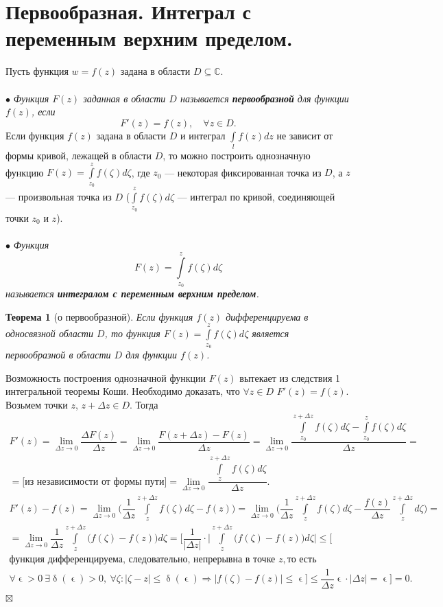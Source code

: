 \documentclass[a4paper, 12pt]{article}
\newenvironment{Proof} %
{\par\noindent{$\blacklozenge$}} %
{\hfill$\scriptstyle\boxtimes$}
\newcommand{\Cm}{\mathbb{C}}
\renewcommand{\leq}{\leqslant}
\renewcommand{\delta}{\updelta}
\newcommand{\intl}{\int\limits_l}
\renewcommand{\epsilon}{\upvarepsilon}
\newcommand{\limdef}{\forall \epsilon >0\ \exists \delta (\epsilon) > 0}
\newtheorem*{theorem}{Теорема}
\begin{document}
\section{Первообразная. Интеграл с переменным верхним пределом.}
Пусть функция $w = f(z)$ задана в области $D \subseteq \Cm$.\\\\
$\bullet$ \textit{Функция $F(z)$ заданная в области $D$ называется \textbf{первообразной} для функции $f(z)$, если $$F'(z) = f(z),\quad \forall z \in D.$$}
Если функция $f(z)$ задана в области $D$ и интеграл $\intl f(z)dz$ не зависит от формы кривой, лежащей в области $D$, то можно построить однозначную функцию $F(z) = \int\limits_{z_0}^z f(\zeta)d\zeta$, где $z_0$ --- некоторая фиксированная точка из $D$, а $z$ --- произвольная точка из $D$ ($\int\limits_{z_0}^z f(\zeta)d\zeta$ --- интеграл по кривой, соединяющей точки $z_0$ и $z$).\\\\
$\bullet$ \textit{Функция $$F(z) = \int\limits_{z_0}^z f(\zeta)d\zeta$$ называется \textbf{интегралом с переменным верхним пределом}.}\begin{theorem}
	[о первообразной] Если функция $f(z)$ дифференцируема в односвязной области $D$, то функция $F(z) = \int\limits_{z_0}^z f(\zeta)d\zeta$ является первообразной в области $D$ для функции $f(z)$.
\end{theorem}\begin{Proof}
Возможность построения однозначной функции $F(z)$ вытекает из  следствия 1 интегральной теоремы Коши. Необходимо доказать, что $\forall z \in D$ $F'(z) = f(z)$. Возьмем точки $z$, $z + \Delta z \in D$. Тогда \begin{multline*}
	F'(z) = \lim\limits_{\Delta z \to 0} \dfrac{\Delta F(z)}{\Delta z} = \lim\limits_{\Delta z \to 0} \dfrac{F(z + \Delta z) - F(z)}{\Delta z} = \lim\limits_{\Delta z \to 0} \dfrac{\int\limits_{z_0}^{z + \Delta z}f(\zeta)d\zeta - \int\limits_{z_0}^{z}f(\zeta)d\zeta}{\Delta z}=\\=\text{[из независимости от формы пути]} = \lim\limits_{\Delta z \to 0} \dfrac{\int\limits_{z}^{z + \Delta z}f(\zeta)d\zeta}{\Delta z}.
\end{multline*}
\begin{multline*}
	F'(z) - f(z) = \lim\limits_{\Delta z \to 0}\Big(\dfrac{1}{\Delta z}\int\limits_{z}^{z + \Delta z}f(\zeta)d\zeta - f(z) \Big) = \lim\limits_{\Delta z \to 0}\Big(\dfrac{1}{\Delta z}\int\limits_{z}^{z + \Delta z}f(\zeta)d\zeta - \dfrac{f(z)}{\Delta z} \int\limits_{z}^{z + \Delta z}d\zeta \Big) = \\ =\lim\limits_{\Delta z \to 0} \dfrac{1}{\Delta z} \int\limits_{z}^{z + \Delta z} \Big( f(\zeta) - f(z)\Big)d\zeta = \Big[ \dfrac{1}{|\Delta z|}\cdot \Big|\int\limits_{z}^{z + \Delta z} \Big( f(\zeta) - f(z)\Big)d\zeta\Big|\leq \big[\\ \text{функция дифференцируема, следовательно, непрерывна в точке } z, \text{то есть} \\ \limdef,\ \forall\zeta : |\zeta - z |\leq\delta (\epsilon) \Rightarrow |f(\zeta) - f(z)|\leq \epsilon \big] \leq \dfrac{1}{\Delta z}\epsilon\cdot |\Delta z| = \epsilon\Big] = 0.
\end{multline*}
\end{Proof}\\
\end{document}
